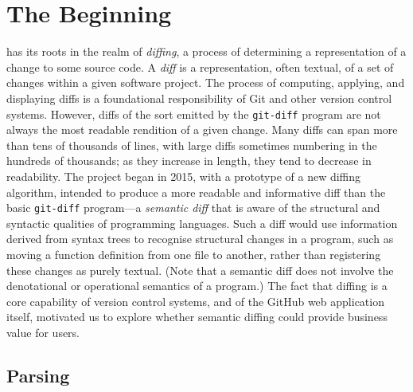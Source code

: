 \documentclass[acmsmall,fleqn]{acmart}
\begin{document}


\section{The Beginning} \label{sec:beginning}

\semantic{} has its roots in the realm of \emph{diffing}, a process of
determining a representation of a change to some source code. A \emph{diff} is a
representation, often textual, of a set of changes within a given software
project. The process of computing, applying, and displaying diffs is a
foundational responsibility of Git and other version control systems. However,
diffs of the sort emitted by the \texttt{git-diff} program are not always the
most readable rendition of a given change. Many diffs can span more than tens of
thousands of lines, with large diffs sometimes numbering in the hundreds of
thousands; as they increase in length, they tend to decrease in readability. The
\semantic{} project began in 2015, with a prototype of a new diffing algorithm,
intended to produce a more readable and informative diff than the basic
\texttt{git-diff} program---a \emph{semantic diff} that is aware of the
structural and syntactic qualities of programming languages. Such a diff would
use information derived from syntax trees to recognise structural changes in a
program, such as moving a function definition from one file to another, rather
than registering these changes as purely textual. (Note that a semantic diff
does not involve the denotational or operational semantics of a program.) The
fact that diffing is a core capability of version control systems, and of the
GitHub web application itself, motivated us to explore whether semantic diffing
could provide business value for users.

\subsection{Parsing}
\end{document}
